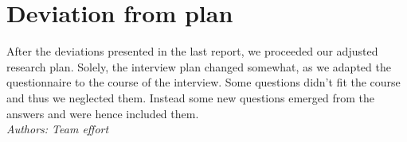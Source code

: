 \documentclass[sigchi-a, authorversion]{acmart}
\begin{document}
\section{Deviation from plan}
\label{deviation_from_plan}
After the deviations presented in the last report, we proceeded our adjusted research plan. Solely, the interview plan changed somewhat, as we adapted the questionnaire to the course of the interview. Some questions didn't fit the course and thus we neglected them. Instead some new questions emerged from the answers and were hence included them. \\
\textit{Authors: Team effort}\\

\nocite{*}


\end{document}

